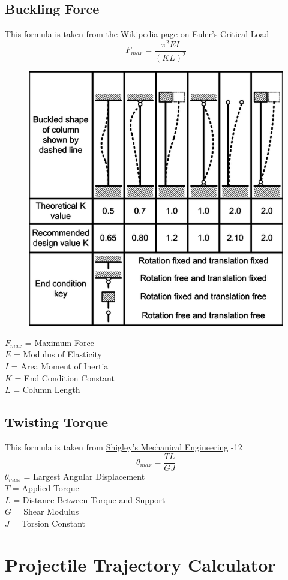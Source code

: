 \documentclass[11pt,a4paper,titlepage]{article}
\begin{document}
	\subsection{Buckling Force}
	This formula is taken from the Wikipedia page on  \href{https://en.wikipedia.org/wiki/Euler\%27s_critical_load}{Euler's Critical Load}
	\begin{equation}
		F_{max} = \frac{\pi^2 EI}{(KL)^2}
	\end{equation}
	\begin{figure}[H]
		\centering
		\includegraphics[width=0.5\linewidth]{"ColumnEffectiveLength"}
	\end{figure}
	$F_{max}$ = Maximum Force \\
	$E$ = Modulus of Elasticity \\
	$I$ = Area Moment of Inertia \\
	$K$ = End Condition Constant \\
	$L$ = Column Length
	
	\subsection{Twisting Torque}
	This formula is taken from \href{https://fac.ksu.edu.sa/sites/default/files/mechanical-disgin-shigley.pdf}{Shigley's Mechanical Engineering} -12
	\begin{equation}
		\theta_{max} = \frac{T L}{G J}
	\end{equation}
	$\theta_{max}$ = Largest Angular Displacement \\
	$T$ = Applied Torque \\
	$L$ = Distance Between Torque and Support \\
	$G$ = Shear Modulus \\
	$J$ = Torsion Constant
	
	\newpage
	\section{Projectile Trajectory Calculator}
\end{document}
